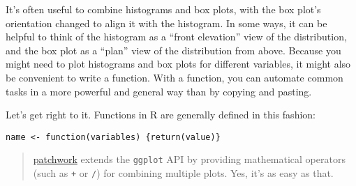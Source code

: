 \documentclass[
]{article}
\begin{document}
It's often useful to combine histograms and box plots, with the box
plot's orientation changed to align it with the histogram. In some ways,
it can be helpful to think of the histogram as a ``front elevation''
view of the distribution, and the box plot as a ``plan'' view of the
distribution from above. Because you might need to plot histograms and
box plots for different variables, it might also be convenient to write
a function. With a function, you can automate common tasks in a more
powerful and general way than by copying and pasting.

Let's get right to it. Functions in R are generally defined in this
fashion:

\texttt{name\ \textless{}-\ function(variables)\ \{return(value)\}}

\begin{quote}
\href{https://patchwork.data-imaginist.com/}{patchwork} extends the
\texttt{ggplot} API by providing mathematical operators (such as
\texttt{+} or \texttt{/}) for combining multiple plots. Yes, it's as
easy as that.
\end{quote}
\end{document}
